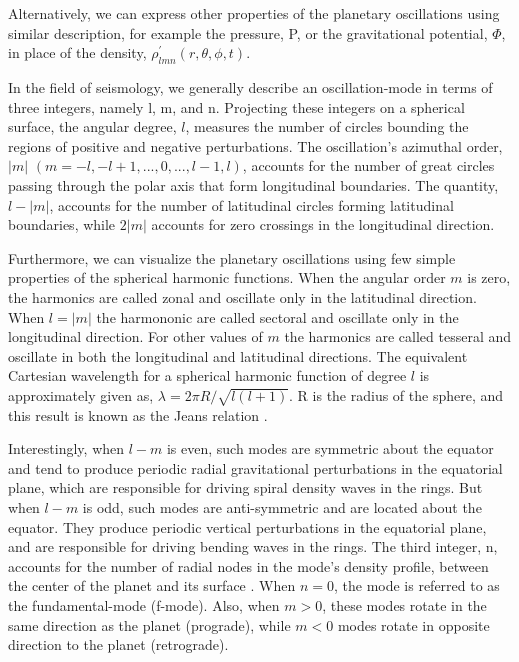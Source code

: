 \documentclass{article}
\begin{document}
Alternatively, we can express other properties of the planetary oscillations using similar description, for example the pressure, P, or the gravitational potential, $\Phi$, in place of the density, $\rho_{lmn}^{'}(r,\theta,\phi,t)$.

In the field of seismology, we generally describe an oscillation-mode in terms of three integers, namely l, m, and n. Projecting these integers on a spherical surface, the angular degree, $l$, measures the number of circles bounding the regions of positive and negative perturbations. The oscillation's azimuthal order, $|m|$ $(m = -l, -l+1, ..., 0,..., l-1, l)$, accounts for the number of great circles passing through the polar axis that form longitudinal boundaries. The quantity, $l-|m|$, accounts for the number of latitudinal circles forming latitudinal boundaries, while $2|m|$ accounts for zero crossings in the longitudinal direction. 

Furthermore, we can visualize the planetary oscillations using few simple properties of the spherical harmonic functions. When the angular order $m$ is zero, the harmonics are called zonal and oscillate only in the latitudinal direction. When $l=|m|$ the harmononic are called sectoral and oscillate only in the longitudinal direction.  For other values of $m$ the harmonics are called tesseral and oscillate in both the longitudinal and latitudinal directions. The equivalent Cartesian wavelength for a spherical harmonic function of degree $l$ is approximately given as, $\lambda = 2\pi R/\sqrt{l(l+1)}$. R is the radius of the sphere, and this result is known as the Jeans relation \cite{https://doi.org/10.1029/2018GC007529}.


Interestingly, when $l-m$ is even, such modes are symmetric about the equator and tend to produce periodic radial gravitational perturbations in the equatorial plane, which are responsible for driving spiral density waves in the rings. But when $l-m$ is odd, such modes are anti-symmetric and are located about the equator. They produce periodic vertical perturbations in the equatorial plane, and are responsible for driving bending waves in the rings. The third integer, n, accounts for the number of radial nodes in the mode's density profile, between the center of the planet and its surface \cite{FRENCH2021114660}. When $n=0$, the mode is referred to as the fundamental-mode (f-mode). Also, when $m>0$, these modes rotate in the same direction as the planet (prograde), while $m<0$ modes rotate in opposite direction to the planet (retrograde). 
\end{document}
